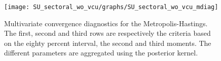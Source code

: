  
\begin{figure}[H]
\centering 
\texttt{[image: SU\_sectoral\_wo\_vcu/graphs/SU\_sectoral\_wo\_vcu\_mdiag]}
\caption{Multivariate convergence diagnostics for the Metropolis-Hastings.
The first, second and third rows are respectively the criteria based on
the eighty percent interval, the second and third moments. The different 
parameters are aggregated using the posterior kernel.}\label{Fig:MultivariateDiagnostics}
\end{figure}

